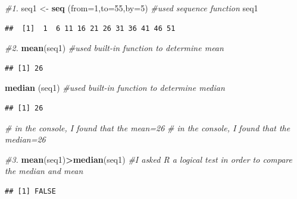 \documentclass[
]{article}
\newenvironment{Shaded}{\begin{snugshade}}{\end{snugshade}}
\newcommand{\AttributeTok}[1]{\textcolor[rgb]{0.13,0.29,0.53}{#1}}
\newcommand{\CommentTok}[1]{\textcolor[rgb]{0.56,0.35,0.01}{\textit{#1}}}
\newcommand{\DecValTok}[1]{\textcolor[rgb]{0.00,0.00,0.81}{#1}}
\newcommand{\FunctionTok}[1]{\textcolor[rgb]{0.13,0.29,0.53}{\textbf{#1}}}
\newcommand{\NormalTok}[1]{#1}
\newcommand{\OtherTok}[1]{\textcolor[rgb]{0.56,0.35,0.01}{#1}}
\newcommand{\SpecialCharTok}[1]{\textcolor[rgb]{0.81,0.36,0.00}{\textbf{#1}}}
\begin{document}
\begin{Shaded}
\begin{Highlighting}[]
\CommentTok{\#1. }
\NormalTok{seq1 }\OtherTok{\textless{}{-}} \FunctionTok{seq}\NormalTok{ (}\AttributeTok{from=}\DecValTok{1}\NormalTok{,}\AttributeTok{to=}\DecValTok{55}\NormalTok{,}\AttributeTok{by=}\DecValTok{5}\NormalTok{) }\CommentTok{\#used sequence function}
\NormalTok{seq1}
\end{Highlighting}
\end{Shaded}

\begin{verbatim}
##  [1]  1  6 11 16 21 26 31 36 41 46 51
\end{verbatim}

\begin{Shaded}
\begin{Highlighting}[]
\CommentTok{\#2. }
\FunctionTok{mean}\NormalTok{(seq1) }\CommentTok{\#used built{-}in function to determine mean       }
\end{Highlighting}
\end{Shaded}

\begin{verbatim}
## [1] 26
\end{verbatim}

\begin{Shaded}
\begin{Highlighting}[]
\FunctionTok{median}\NormalTok{ (seq1) }\CommentTok{\#used built{-}in function to determine median  }
\end{Highlighting}
\end{Shaded}

\begin{verbatim}
## [1] 26
\end{verbatim}

\begin{Shaded}
\begin{Highlighting}[]
 \CommentTok{\# in the console, I found that the mean=26}
 \CommentTok{\# in the console, I found that the median=26}

\CommentTok{\#3. }
\FunctionTok{mean}\NormalTok{(seq1)}\SpecialCharTok{\textgreater{}}\FunctionTok{median}\NormalTok{(seq1) }\CommentTok{\#I asked R a logical test in order to compare the median and mean}
\end{Highlighting}
\end{Shaded}

\begin{verbatim}
## [1] FALSE
\end{verbatim}
\end{document}
